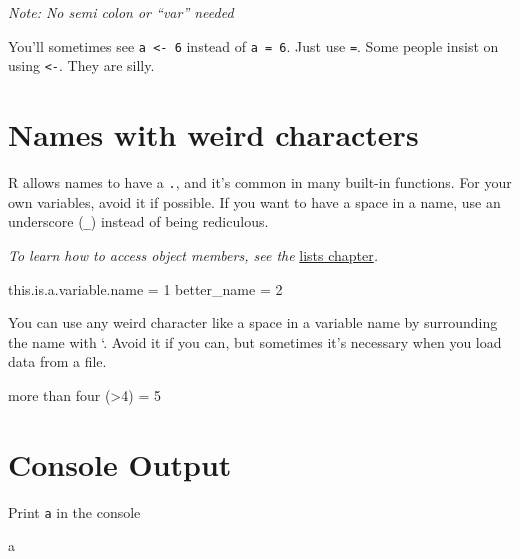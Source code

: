 \documentclass[
]{book}
\newenvironment{Shaded}{\begin{snugshade}}{\end{snugshade}}
\newcommand{\AttributeTok}[1]{\textcolor[rgb]{0.77,0.63,0.00}{#1}}
\newcommand{\DecValTok}[1]{\textcolor[rgb]{0.00,0.00,0.81}{#1}}
\newcommand{\NormalTok}[1]{#1}
\newcommand{\OtherTok}[1]{\textcolor[rgb]{0.56,0.35,0.01}{#1}}
\newcommand{\StringTok}[1]{\textcolor[rgb]{0.31,0.60,0.02}{#1}}
\begin{document}
\emph{Note: No semi colon or ``var'' needed}

You'll sometimes see \texttt{a\ \textless{}-\ 6} instead of \texttt{a\ =\ 6}. Just use \texttt{=}. Some people insist on using \texttt{\textless{}-}. They are silly.

\hypertarget{names-with-weird-characters}{%
\section{Names with weird characters}\label{names-with-weird-characters}}

R allows names to have a \texttt{.}, and it's common in many built-in functions. For your own variables, avoid it if possible. If you want to have a space in a name, use an underscore (\texttt{\_}) instead of being rediculous.

\emph{To learn how to access object members, see the} \href{lists.html\#accessing-elements-in-a-list}{lists chapter}\emph{.}

\begin{Shaded}
\begin{Highlighting}[]
\NormalTok{this.is.a.variable.name }\OtherTok{=} \DecValTok{1}
\NormalTok{better\_name }\OtherTok{=} \DecValTok{2}
\end{Highlighting}
\end{Shaded}

You can use any weird character like a space in a variable name by surrounding the name with `. Avoid it if you can, but sometimes it's necessary when you load data from a file.

\begin{Shaded}
\begin{Highlighting}[]
\StringTok{\textasciigrave{}}\AttributeTok{more than four (\textgreater{}4)}\StringTok{\textasciigrave{}} \OtherTok{=} \DecValTok{5}
\end{Highlighting}
\end{Shaded}

\hypertarget{console-output}{%
\section{Console Output}\label{console-output}}

Print \texttt{a} in the console

\begin{Shaded}
\begin{Highlighting}[]
\NormalTok{a}
\end{Highlighting}
\end{Shaded}
\end{document}
